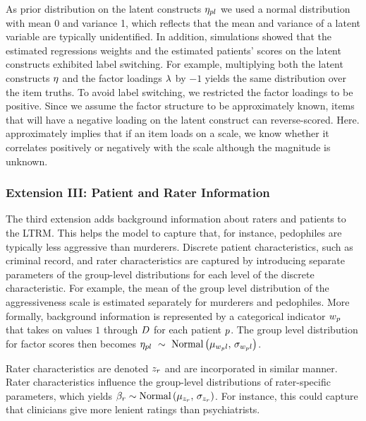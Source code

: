 \documentclass[a4paper,usenames,dvipsnames]{article}
\newcommand{\MR}	[1] 	{}%
\begin{document}
As prior distribution on the latent constructs $\eta_{pl}$ we used a normal distribution with mean 0 and variance 1, which reflects that the mean and variance of a latent variable are typically  unidentified. In addition, simulations showed that the estimated regressions weights and the estimated patients' scores on the latent constructs exhibited label switching. For example, multiplying both the latent constructs $\eta$ and the factor loadings $\lambda$ by $-1$ yields the same distribution over the item truths. To avoid label switching, we restricted the factor loadings to be positive. Since we assume the factor structure to be approximately known, items that will have a negative loading on the latent construct can reverse-scored. Here. approximately implies that if an item loads on a scale, we know whether it correlates positively or negatively with the scale although the magnitude is unknown.

\subsubsection*{Extension III: Patient and Rater Information}
The third extension adds background information about raters and patients to the LTRM. This helps the model to capture that, for instance, pedophiles are typically less aggressive than murderers. Discrete patient characteristics, such as criminal record,  and rater characteristics are captured by introducing separate parameters of the group-level distributions for each level of the discrete characteristic. For example, the mean of the group level distribution of the aggressiveness scale is estimated separately for murderers and pedophiles. More formally, background information is represented by a categorical indicator $w_{p}$ that takes on values $1$ through $\TdiscreteP$ for each patient $p$. The group level distribution for factor scores then becomes $\eta_{pl}~\sim~\text{Normal}\left(\mu_{w_pl},\,\sigma_{w_pl}\right)$.

 Rater characteristics are denoted $z_r$ and are incorporated in similar manner. Rater characteristics influence the group-level distributions of rater-specific parameters, which yields $\beta_r \sim \text{Normal}\left(\mu_{z_r},\,\sigma_{z_r}\right)$. For instance, this could capture that clinicians give more lenient ratings than psychiatrists.
\end{document}
